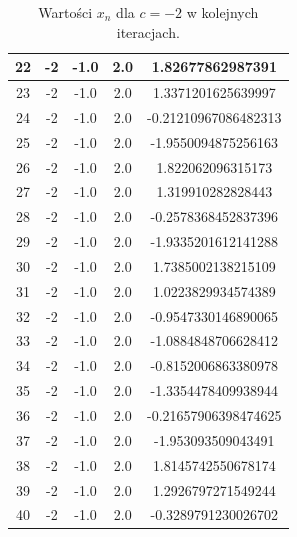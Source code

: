 \documentclass{article}
\begin{document}
\begin{table}[H]
\begin{adjustbox}{center}
\begin{tabular}{|c|c|c|c|c|}
    \hline
    22 & -2 & -1.0 & 2.0 & 1.82677862987391\\
    \hline
    23 & -2 & -1.0 & 2.0 & 1.3371201625639997\\
    \hline
    24 & -2 & -1.0 & 2.0 & -0.21210967086482313\\
    \hline
    25 & -2 & -1.0 & 2.0 & -1.9550094875256163\\
    \hline
    26 & -2 & -1.0 & 2.0 & 1.822062096315173\\
    \hline
    27 & -2 & -1.0 & 2.0 & 1.319910282828443\\
    \hline
    28 & -2 & -1.0 & 2.0 & -0.2578368452837396\\
    \hline
    29 & -2 & -1.0 & 2.0 & -1.9335201612141288\\
    \hline
    30 & -2 & -1.0 & 2.0 & 1.7385002138215109\\
    \hline
    31 & -2 & -1.0 & 2.0 & 1.0223829934574389\\
    \hline
    32 & -2 & -1.0 & 2.0 & -0.9547330146890065\\
    \hline
    33 & -2 & -1.0 & 2.0 & -1.0884848706628412\\
    \hline
    34 & -2 & -1.0 & 2.0 & -0.8152006863380978\\
    \hline
    35 & -2 & -1.0 & 2.0 & -1.3354478409938944\\
    \hline
    36 & -2 & -1.0 & 2.0 & -0.21657906398474625\\
    \hline
    37 & -2 & -1.0 & 2.0 & -1.953093509043491\\
    \hline
    38 & -2 & -1.0 & 2.0 & 1.8145742550678174\\
    \hline
    39 & -2 & -1.0 & 2.0 & 1.2926797271549244\\
    \hline
    40 & -2 & -1.0 & 2.0 & -0.3289791230026702\\
    \hline
\end{tabular}
\end{adjustbox}
\caption{Wartości $x_n$ dla $c = -2$ w kolejnych iteracjach.}
\end{table}
\end{document}

